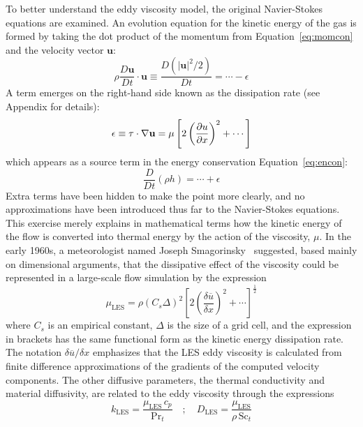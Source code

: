 \documentclass[graybox]{svmult}
\begin{document}
To better understand the eddy viscosity model, the original Navier-Stokes equations are examined. An evolution equation for the kinetic energy of the gas is formed by taking the dot product of the momentum from Equation~\ref{eq:momcon} and the velocity vector $\mathbf{u}$:
\begin{equation}
\rho \frac{D \mathbf{u}}{Dt} \cdot \mathbf{u} \equiv \frac{D(|\mathbf{u}|^2/2)}{Dt} = \cdots - \epsilon
\label{eq:momdotu}
\end{equation}
A term emerges on the right-hand side known as the dissipation rate (see Appendix for details):
\begin{equation}
\epsilon \equiv \tens{\tau} \cdot \nabla \mathbf{u} = \mu \left[ 2 \left( \frac{\partial u}{\partial x} \right)^2 + \cdots \right]
\label{eq:epsilondef}
\end{equation}
which appears as a source term in the energy conservation Equation~\ref{eq:encon}:
\begin{equation}
\frac{D}{Dt} (\rho h) = \cdots + \epsilon
\end{equation}
Extra terms have been hidden to make the point more clearly, and no approximations have been introduced thus far to the Navier-Stokes equations. This exercise merely explains in mathematical terms how the kinetic energy of the flow is converted into thermal energy by the action of the viscosity, $\mu$. In the early 1960s, a meteorologist named Joseph Smagorinsky~\cite{Smagorinsky} suggested, based mainly on dimensional arguments, that the dissipative effect of the viscosity could be represented in a large-scale flow simulation by the expression
\begin{equation}
\mu_{\mathrm{LES}} = \rho (C_s \Delta)^2 \left[ 2 \left( \frac{\delta \overline{u}}{\delta x} \right)^2 + \cdots \right]^{\frac{1}{2}}
\label{eq:muLES}
\end{equation}
where $C_s$ is an empirical constant, $\Delta$ is the size of a grid cell, and the expression in brackets has the same functional form as the kinetic energy dissipation rate. The notation $\delta \overline{u}/\delta x$ emphasizes that the LES  eddy viscosity is calculated from finite difference approximations of the gradients of the computed velocity components. The other diffusive parameters, the thermal conductivity and material diffusivity, are related to the eddy viscosity through the expressions
\begin{equation}
k_{\mathrm{LES}} = \frac{\mu_{\mathrm{LES}} \, c_p}{\mathrm{Pr}_t} \quad ; \quad D_{\mathrm{LES}} = \frac{\mu_{\mathrm{LES}}}{\rho \, \mathrm{Sc}_t}
\end{equation}
\end{document}
